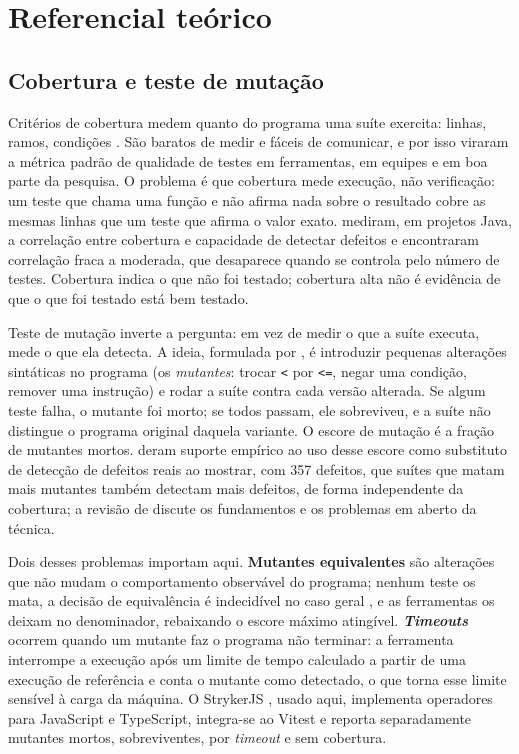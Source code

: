 \chapter{Referencial teórico}
\label{cap:referencial}

\section{Cobertura e teste de mutação}

Critérios de cobertura medem quanto do programa uma suíte exercita: linhas, ramos, condições \cite{ammann2016}. São baratos de medir e fáceis de comunicar, e por isso viraram a métrica padrão de qualidade de testes em ferramentas, em equipes e em boa parte da pesquisa. O problema é que cobertura mede execução, não verificação: um teste que chama uma função e não afirma nada sobre o resultado cobre as mesmas linhas que um teste que afirma o valor exato.  mediram, em projetos Java, a correlação entre cobertura e capacidade de detectar defeitos e encontraram correlação fraca a moderada, que desaparece quando se controla pelo número de testes. Cobertura indica o que não foi testado; cobertura alta não é evidência de que o que foi testado está bem testado.

Teste de mutação inverte a pergunta: em vez de medir o que a suíte executa, mede o que ela detecta. A ideia, formulada por , é introduzir pequenas alterações sintáticas no programa (os \textit{mutantes}: trocar \texttt{<} por \texttt{<=}, negar uma condição, remover uma instrução) e rodar a suíte contra cada versão alterada. Se algum teste falha, o mutante foi morto; se todos passam, ele sobreviveu, e a suíte não distingue o programa original daquela variante. O escore de mutação é a fração de mutantes mortos.  deram suporte empírico ao uso desse escore como substituto de detecção de defeitos reais ao mostrar, com 357 defeitos, que suítes que matam mais mutantes também detectam mais defeitos, de forma independente da cobertura; a revisão de  discute os fundamentos e os problemas em aberto da técnica.

Dois desses problemas importam aqui. \textbf{Mutantes equivalentes} são alterações que não mudam o comportamento observável do programa; nenhum teste os mata, a decisão de equivalência é indecidível no caso geral \cite{papadakis2019}, e as ferramentas os deixam no denominador, rebaixando o escore máximo atingível. \textbf{\textit{Timeouts}} ocorrem quando um mutante faz o programa não terminar: a ferramenta interrompe a execução após um limite de tempo calculado a partir de uma execução de referência e conta o mutante como detectado, o que torna esse limite sensível à carga da máquina. O StrykerJS \cite{stryker}, usado aqui, implementa operadores para JavaScript e TypeScript, integra-se ao Vitest \cite{vitest} e reporta separadamente mutantes mortos, sobreviventes, por \textit{timeout} e sem cobertura.

